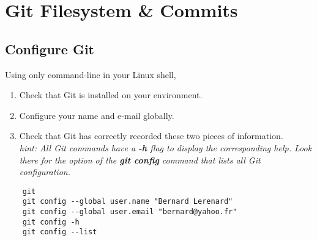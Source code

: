 
\setcounter{section}{1}



\section{Git Filesystem \& Commits}

\subsection{Configure Git}  %
Using only command-line in your Linux shell,
\begin{enumerate}
    \item Check that Git is installed on your environment.
    \item Configure your name and e-mail globally.
    \item Check that Git has correctly recorded these two pieces of information. \\
    \textit{hint: All Git commands have a \textbf{-h} flag to display the corresponding help.
    Look there for the option of the \textbf{git config} command that lists all Git configuration.}
\end{enumerate}

\ifdefined\answer
\begin{verbatim}
    git
    git config --global user.name "Bernard Lerenard"
    git config --global user.email "bernard@yahoo.fr"
    git config -h
    git config --list
\end{verbatim}
\fi

